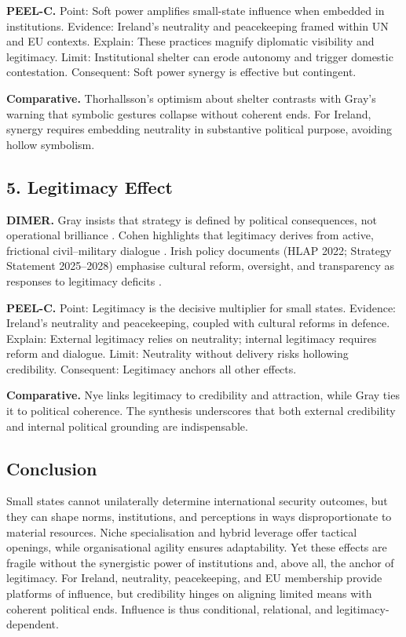 \textbf{PEEL-C.} Point: Soft power amplifies small-state influence when embedded in institutions. Evidence: Ireland’s neutrality and peacekeeping framed within UN and EU contexts. Explain: These practices magnify diplomatic visibility and legitimacy. Limit: Institutional shelter can erode autonomy and trigger domestic contestation. Consequent: Soft power synergy is effective but contingent. 

\textbf{Comparative.} Thorhallsson’s optimism about shelter contrasts with Gray’s warning that symbolic gestures collapse without coherent ends. For Ireland, synergy requires embedding neutrality in substantive political purpose, avoiding hollow symbolism.

\subsection*{5. Legitimacy Effect}
\textbf{DIMER.} Gray insists that strategy is defined by political consequences, not operational brilliance \parencite{GRAY_2018}. Cohen highlights that legitimacy derives from active, frictional civil–military dialogue \parencite{COHEN_2002}. Irish policy documents (HLAP 2022; Strategy Statement 2025–2028) emphasise cultural reform, oversight, and transparency as responses to legitimacy deficits \parencite{DOD_2025}. 

\textbf{PEEL-C.} Point: Legitimacy is the decisive multiplier for small states. Evidence: Ireland’s neutrality and peacekeeping, coupled with cultural reforms in defence. Explain: External legitimacy relies on neutrality; internal legitimacy requires reform and dialogue. Limit: Neutrality without delivery risks hollowing credibility. Consequent: Legitimacy anchors all other effects. 

\textbf{Comparative.} Nye links legitimacy to credibility and attraction, while Gray ties it to political coherence. The synthesis underscores that both external credibility and internal political grounding are indispensable.

\subsection*{Conclusion}
Small states cannot unilaterally determine international security outcomes, but they can shape norms, institutions, and perceptions in ways disproportionate to material resources. Niche specialisation and hybrid leverage offer tactical openings, while organisational agility ensures adaptability. Yet these effects are fragile without the synergistic power of institutions and, above all, the anchor of legitimacy. For Ireland, neutrality, peacekeeping, and EU membership provide platforms of influence, but credibility hinges on aligning limited means with coherent political ends. Influence is thus conditional, relational, and legitimacy-dependent.



